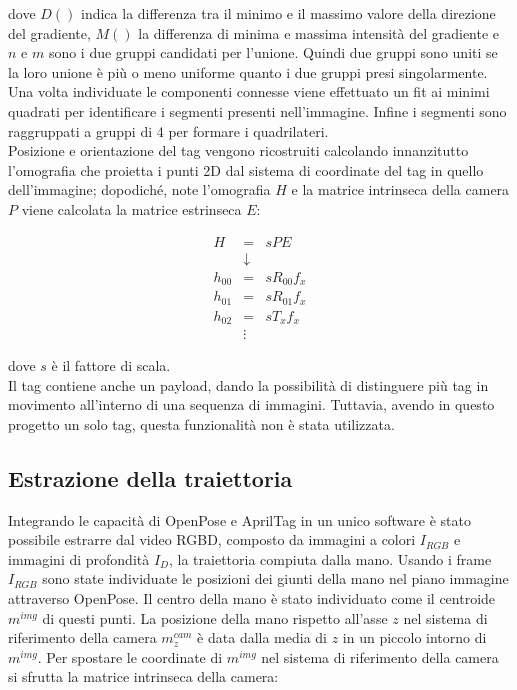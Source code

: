 \documentclass[10pt,twocolumn]{article}
\begin{document}
  dove $D()$ indica la differenza tra il minimo e il massimo valore della
  direzione del gradiente, $M()$ la differenza di minima e massima intensità del
  gradiente e $n$ e $m$ sono i due gruppi candidati per l'unione. Quindi due
  gruppi sono uniti se la loro unione è più o meno uniforme quanto i due gruppi
  presi singolarmente. Una volta individuate le componenti connesse viene
  effettuato un fit ai minimi quadrati per identificare i segmenti presenti
  nell'immagine. Infine i segmenti sono raggruppati a gruppi di 4 per formare i
  quadrilateri. \\
  Posizione e orientazione del tag vengono ricostruiti calcolando innanzitutto
  l'omografia che proietta i punti 2D dal sistema di coordinate del tag in
  quello dell'immagine; dopodiché, note l'omografia $H$ e la matrice intrinseca
  della camera $P$ viene calcolata la matrice estrinseca $E$:

  \begin{eqnarray*}
    H      & = & sPE \\
           & \downarrow & \\
    h_{00} & = & sR_{00}f_x \\
    h_{01} & = & sR_{01}f_x \\
    h_{02} & = & sT_xf_x \\
           & \vdots &
  \end{eqnarray*}

  dove $s$ è il fattore di scala. \\
  Il tag contiene anche un payload, dando la possibilità di distinguere più tag
  in movimento all'interno di una sequenza di immagini. Tuttavia, avendo in
  questo progetto un solo tag, questa funzionalità non è stata utilizzata.

  \subsection{Estrazione della traiettoria}
  \label{sec:alg_traiettoria}
  Integrando le capacità di OpenPose e AprilTag in un unico software è stato
  possibile estrarre dal video RGBD, composto da immagini a colori $I_{RGB}$ e
  immagini di profondità $I_{D}$, la traiettoria compiuta dalla mano. Usando i
  frame $I_{RGB}$ sono state individuate le posizioni dei giunti della mano nel
  piano immagine attraverso OpenPose. Il centro della mano è stato individuato
  come il centroide $m^{img}$ di questi punti. La posizione della mano rispetto
  all'asse $z$ nel sistema di riferimento della camera $m_z^{cam}$ è data dalla
  media di $z$ in un piccolo intorno di $m^{img}$. Per spostare le coordinate di
  $m^{img}$ nel sistema di riferimento della camera si sfrutta la matrice
  intrinseca della camera:
  
\end{document}
